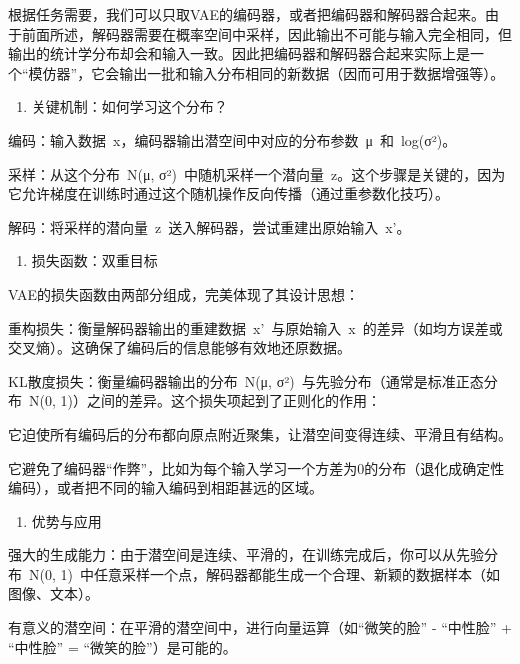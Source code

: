 根据任务需要，我们可以只取VAE的编码器，或者把编码器和解码器合起来。由于前面所述，解码器需要在概率空间中采样，因此输出不可能与输入完全相同，但输出的统计学分布却会和输入一致。因此把编码器和解码器合起来实际上是一个``模仿器''，它会输出一批和输入分布相同的新数据（因而可用于数据增强等）。

\begin{enumerate}
\def\labelenumi{\arabic{enumi}.}
\setcounter{enumi}{1}
\tightlist
\item
  关键机制：如何学习这个分布？
\end{enumerate}

编码：输入数据~x，编码器输出潜空间中对应的分布参数~μ~和~log(σ²)。

采样：从这个分布~N(μ, σ²)~中随机采样一个潜向量~z。这个步骤是关键的，因为它允许梯度在训练时通过这个随机操作反向传播（通过重参数化技巧）。

解码：将采样的潜向量~z~送入解码器，尝试重建出原始输入~x'。

\begin{enumerate}
\def\labelenumi{\arabic{enumi}.}
\setcounter{enumi}{2}
\tightlist
\item
  损失函数：双重目标
\end{enumerate}

VAE的损失函数由两部分组成，完美体现了其设计思想：

重构损失：衡量解码器输出的重建数据~x'~与原始输入~x~的差异（如均方误差或交叉熵）。这确保了编码后的信息能够有效地还原数据。

KL散度损失：衡量编码器输出的分布~N(μ, σ²)~与先验分布（通常是标准正态分布~N(0, 1)）之间的差异。这个损失项起到了正则化的作用：

它迫使所有编码后的分布都向原点附近聚集，让潜空间变得连续、平滑且有结构。

它避免了编码器``作弊''，比如为每个输入学习一个方差为0的分布（退化成确定性编码），或者把不同的输入编码到相距甚远的区域。

\begin{enumerate}
\def\labelenumi{\arabic{enumi}.}
\setcounter{enumi}{3}
\tightlist
\item
  优势与应用
\end{enumerate}

强大的生成能力：由于潜空间是连续、平滑的，在训练完成后，你可以从先验分布~N(0, 1)~中任意采样一个点，解码器都能生成一个合理、新颖的数据样本（如图像、文本）。

有意义的潜空间：在平滑的潜空间中，进行向量运算（如``微笑的脸'' - ``中性脸'' + ``中性脸'' = ``微笑的脸''）是可能的。

